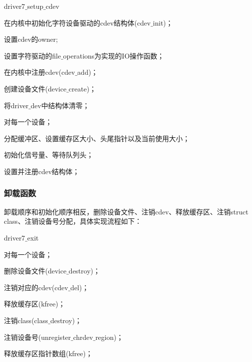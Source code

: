 \documentclass[UTF8]{ctexart}
\begin{document}
\begin{algorithm}
\caption{driver7$\_$setup$\_$cdev}
\begin{algorithmic}[1]
\STATE 在内核中初始化字符设备驱动的cdev结构体(cdev$\_$init)；\par
\STATE 设置cdev的owner;\par
\STATE 设置字符驱动的file$\_$operations为实现的IO操作函数；\par
\STATE 在内核中注册cdev(cdev$\_$add)；\par
\STATE 创建设备文件(device$\_$create)；\par
\STATE 将driver$\_$dev中结构体清零；\par
\STATE 对每一个设备；\par
\STATE \qquad 分配缓冲区、设置缓存区大小、头尾指针以及当前使用大小；\par
\STATE \qquad 初始化信号量、等待队列头；\par
\STATE \qquad 设置并注册cdev结构体；\par
\end{algorithmic}
\end{algorithm}

\subsubsection{卸载函数}
卸载顺序和初始化顺序相反，删除设备文件、注销cdev、释放缓存区、注销struct class、注销设备号分配，具体实现流程如下：\par
\begin{algorithm}
\caption{driver7$\_$exit}
\begin{algorithmic}[1]
\STATE 对每一个设备；\par
\STATE \qquad 删除设备文件(device$\_$destroy)；\par
\STATE \qquad 注销对应的cdev(cdev$\_$del)；\par
\STATE \qquad 释放缓存区(kfree)；\par
\STATE 注销class(class$\_$destroy)；\par
\STATE 注销设备号(unregister$\_$chrdev$\_$region)；\par
\STATE 释放缓存区指针数组(kfree)；\par
\end{algorithmic}
\end{algorithm}
\end{document}
